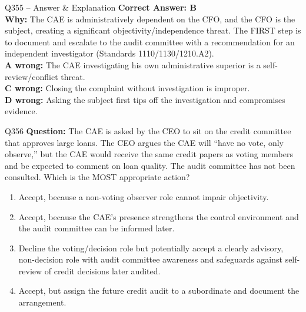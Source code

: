 \documentclass[aspectratio=169,10pt]{beamer}
\begin{document}
	\begin{frame}[t]{Q355 -- Answer \& Explanation}
		\small
		\textbf{Correct Answer: B} \\[4pt]
		\textbf{Why:} The CAE is administratively dependent on the CFO, and the CFO is the subject, creating a significant objectivity/independence threat. The FIRST step is to document and escalate to the audit committee with a recommendation for an independent investigator (Standards 1110/1130/1210.A2). \\[4pt]
		\textbf{A wrong:} The CAE investigating his own administrative superior is a self-review/conflict threat. \\[2pt]
		\textbf{C wrong:} Closing the complaint without investigation is improper. \\[2pt]
		\textbf{D wrong:} Asking the subject first tips off the investigation and compromises evidence.
	\end{frame}
	
	\begin{frame}[t]{Q356}
		\small
		\textbf{Question:} The CAE is asked by the CEO to sit on the credit committee that approves large loans. The CEO argues the CAE will ``have no vote, only observe,'' but the CAE would receive the same credit papers as voting members and be expected to comment on loan quality. The audit committee has not been consulted. Which is the MOST appropriate action?
		\begin{enumerate}[label=\Alph*.,itemsep=1pt,topsep=2pt]
			\item Accept, because a non-voting observer role cannot impair objectivity.
			\item Accept, because the CAE's presence strengthens the control environment and the audit committee can be informed later.
			\item Decline the voting/decision role but potentially accept a clearly advisory, non-decision role with audit committee awareness and safeguards against self-review of credit decisions later audited.
			\item Accept, but assign the future credit audit to a subordinate and document the arrangement.
		\end{enumerate}
	\end{frame}
	
\end{document}
